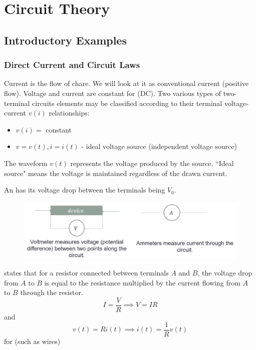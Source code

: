 \documentclass[12pt, a4paper, oneside, openright, titlepage]{book}
\begin{document}
\part{Circuit Theory}

\chapter{Introductory Examples}


\section{Direct Current and Circuit Laws}

Current is the flow of chare. We will look at it as conventional current (positive flow). Voltage and current are constant for  (DC). Two various types of two-terminal circuits elements may be classified according to their terminal voltage-current $v(i)$ relationships: \begin{itemize}
    \item $v(i) = $ constant
    \item $v = v(t), i = i(t)$ - ideal voltage source (independent voltage source)
\end{itemize}

\begin{defn}
    The waveform $v(t)$ represents the voltage produced by the source. ``Ideal source" means the voltage is maintained regardless of the drawn current.
\end{defn}

\begin{defn}
    An  has its voltage drop between the terminals being $V_0$.
\end{defn}

\begin{figure}[H]
    \centering
    \includegraphics[scale = 0.6]{Images/TH1.PNG}
\end{figure}

\begin{defn}
     states that for a resistor connected between terminals $A$ and $B$, the voltage drop from $A$ to $B$ is equal to the resistance multiplied by the current flowing from $A$ to $B$ through the resistor. \begin{equation*}
        I = \frac{V}{R}\implies V = IR
    \end{equation*}
    and \begin{equation*}
        v(t) = Ri(t)\implies i(t) = \frac{1}{R}v(t)
    \end{equation*}
    for  (such as wires)
\end{defn}
\end{document}
